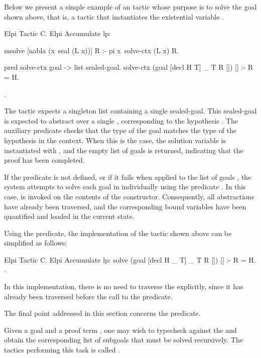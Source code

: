 Below we present a simple example of an \elpi tactic whose purpose is to solve
the goal shown above, that is, a tactic that instantiates the \rocq
existential variable .

\begin{coqcodeX}
Elpi Tactic C.
Elpi Accumulate lp:{{
  msolve [nabla (x\ seal (L x))] R :- pi x\ solve-ctx (L x) R.

  pred solve-ctx goal -> list sealed-goal.
  solve-ctx (goal [decl H T] _ T R []) [] :- R = H.
}}.
\end{coqcodeX}

The tactic expects a singleton list containing a single sealed-goal. This
sealed-goal is expected to abstract over a single , corresponding to
the hypothesis . The auxiliary predicate  checks that the
type of the goal matches the type of the hypothesis in the context. When this is
the case, the solution variable  is instantiated with , and the
empty list of goals is returned, indicating that the proof has been completed.


If the predicate  is not defined, or if it fails when applied to
the list of goals , the system attempts to solve each goal in 
individually using the predicate . In this case,  is
invoked on the contents of the  constructor. Consequently, all
 abstractions have already been traversed, and the corresponding
bound variables have been quantified and loaded in the current state.

\begin{center}
\end{center}

Using the  predicate, the implementation of the tactic  shown
above can be simplified as follows:

\begin{coqcodeX}
Elpi Tactic C.
Elpi Accumulate lp:{{
solve (goal [decl H _ T] _ T R []) [] :- R = H.
}}.
\end{coqcodeX}

In this implementation, there is no need to traverse the 
explicitly, since it has already been traversed before the call to the
 predicate.

The final point addressed in this section concerns the  predicate.

Given a goal  and a proof term , one may wish to typecheck 
against the  and obtain the corresponding list of subgoals that must be
solved recursively. The \rocq tactics performing this task is called
.

